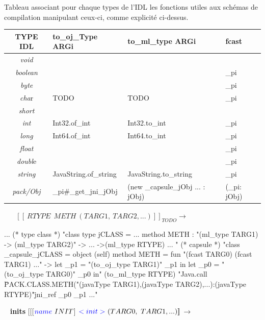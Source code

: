\documentclass[a4paper, 11pt, notitlepage]{article}
\begin{document}
Tableau associant pour chaque types de l'IDL les
fonctions utiles aux schémas de compilation manipulant ceux-ci, comme explicité ci-dessus. 

\begin{tabular}{|c|l|l|l|}
  \hline

  TYPE IDL & to\_oj\_Type ARGi & to\_ml\_type ARGi & fcast\\

  \hline
  \emph{void} &   &  & \\

  \emph{boolean} &  &  &\_pi \\

 \emph{byte} & &  &\_pi  \\

 \emph{cha}r & TODO  & TODO & \_pi \\

  \emph{short} & &  & \\

 \emph{int} & Int32.of\_int\ & Int32.to\_int & \_pi\\

 \emph{long} & Int64.of\_int & Int64.to\_int & \_pi\\

 \emph{float} & & &\_pi \\

  \emph{doubl}e & & & \_pi\\

 \emph{string} & JavaString.of\_string & JavaString.to\_string & \_pi\\

 \emph{pack/Obj} & \_pi\#\_get\_jni\_jObj & (new \_capsule\_jObj ... : jObj) & (\_pi: jObj)\\

  \hline
\end{tabular}
\ 
\newline
\ 
\newline
\noindent
$[\![\ RTYPE\ \ METH\ (TARG1,\ TARG2, ...)]\!]_{ TODO }$$\longrightarrow$

\begin{OCaml}
...
(* type class *)
"class type jCLASS =
   ...
   method METH : "(ml_type TARG1) -> (ml_type TARG2)" -> ... ->(ml_type RTYPE)
   ... "
(* capsule *)
"class _capsule_jCLASS =
   object (self)      
      method METH =
         fun "(fcast TARG0) (fcast TARG1) ..." ->
           let _p1 = "(to_oj_type TARG1)" _p1 in
           let _p0 = "(to_oj_type TARG0)" _p0
           in"
             (to_ml_type RTYPE)
             "Java.call \"PACK.CLASS.METH("(javaType TARG1),(javaType TARG2),...):(javaType RTYPE)"\" jni_ref _p0 _p1 ..."

\end{OCaml}
\ 
\newline
\noindent
\textbf{ inits }
\newline
\noindent
$[\![$[$ {\color{blue}name}\ INIT $]$\ {\color{blue}
      <init>}\ (TARG0,\ TARG1, ...)]\!]_{}$$\longrightarrow$
% 
\end{document}
